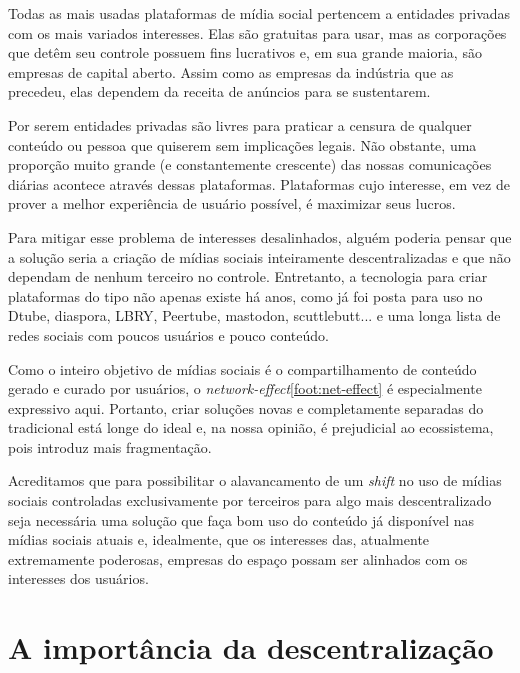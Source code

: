 Todas as mais usadas plataformas de mídia social pertencem a entidades privadas com os mais variados interesses.
Elas são gratuitas para usar, mas as corporações que detêm seu controle possuem fins lucrativos e, em sua grande maioria, são empresas de capital aberto.
Assim como as empresas da indústria que as precedeu, elas dependem da receita de anúncios para se sustentarem.

Por serem entidades privadas são livres para praticar a censura de qualquer conteúdo ou pessoa que quiserem sem implicações legais.
Não obstante, uma proporção muito grande (e constantemente crescente) das nossas comunicações diárias acontece através dessas plataformas.
Plataformas cujo interesse, em vez de prover a melhor experiência de usuário possível, é maximizar seus lucros.

Para mitigar esse problema de interesses desalinhados, alguém poderia pensar que a solução seria a criação de mídias sociais inteiramente descentralizadas e que não dependam de nenhum terceiro no controle.
Entretanto, a tecnologia para criar plataformas do tipo não apenas existe há anos, como já foi posta para uso no Dtube, diaspora, LBRY, Peertube, mastodon, scuttlebutt... e uma longa lista de redes sociais com poucos usuários e pouco conteúdo.

Como o inteiro objetivo de mídias sociais é o compartilhamento de conteúdo gerado e curado por usuários, o \textit{network-effect}\ref{foot:net-effect} é especialmente expressivo aqui.
Portanto, criar soluções novas e completamente separadas do tradicional está longe do ideal e, na nossa opinião, é prejudicial ao ecossistema, pois introduz mais fragmentação.

Acreditamos que para possibilitar o alavancamento de um \textit{shift} no uso de mídias sociais controladas exclusivamente por terceiros para algo mais descentralizado seja necessária uma solução que faça bom uso do conteúdo já disponível nas mídias sociais atuais e, idealmente, que os interesses das, atualmente extremamente poderosas, empresas do espaço possam ser alinhados com os interesses dos usuários. 

\section{A importância da descentralização}

